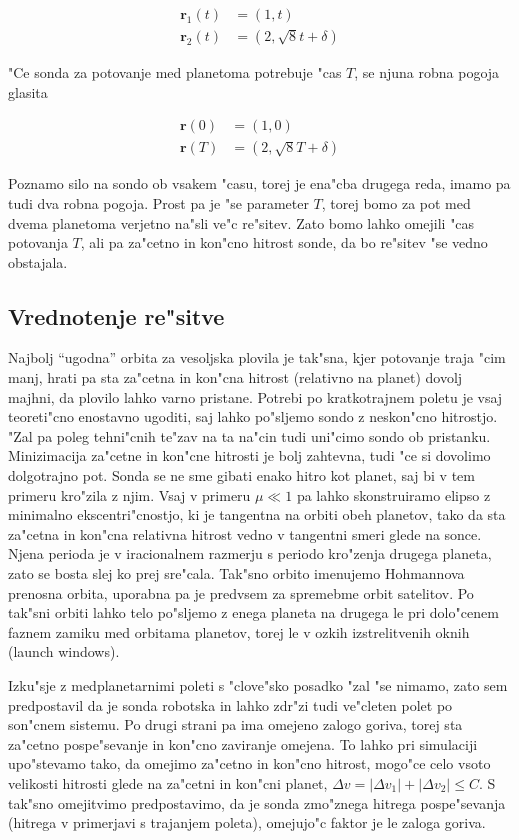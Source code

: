 \documentclass[a4paper,10pt]{article}
\renewcommand{\vec}{\mathbf}
\begin{document}
\begin{align}
 \vec r_1(t) &= (1, t) \\
 \vec r_2(t) &= (2, \sqrt{8}t + \delta)
\end{align}

"Ce sonda za potovanje med planetoma potrebuje "cas $T$, se njuna robna pogoja glasita

\begin{align}
 \vec r(0) &= (1, 0) \\
 \vec r(T) &= (2, \sqrt{8} T + \delta)
\end{align}

Poznamo silo na sondo ob vsakem "casu, torej je ena"cba drugega reda, imamo pa tudi dva robna pogoja. Prost pa je "se parameter $T$, torej bomo za pot med dvema planetoma verjetno na"sli ve"c re"sitev. Zato bomo lahko omejili "cas potovanja $T$, ali pa za"cetno in kon"cno hitrost sonde, da bo re"sitev "se vedno obstajala. 

\subsection{Vrednotenje re"sitve}

Najbolj ``ugodna'' orbita za vesoljska plovila je tak"sna, kjer potovanje traja "cim manj, hrati pa sta za"cetna in kon"cna hitrost (relativno na planet) dovolj majhni, da plovilo lahko varno pristane. Potrebi po kratkotrajnem poletu je vsaj teoreti"cno enostavno ugoditi, saj lahko po"sljemo sondo z neskon"cno hitrostjo. "Zal pa poleg tehni"cnih te"zav na ta na"cin tudi uni"cimo sondo ob pristanku. 
Minizimacija za"cetne in kon"cne hitrosti je bolj zahtevna, tudi "ce si dovolimo dolgotrajno pot. Sonda se ne sme gibati enako hitro kot planet, saj bi v tem primeru kro"zila z njim. Vsaj v primeru $\mu \ll 1$ pa lahko skonstruiramo elipso z minimalno ekscentri"cnostjo, ki je tangentna na orbiti obeh planetov, tako da sta za"cetna in kon"cna relativna hitrost vedno v tangentni smeri glede na sonce. 
Njena perioda je v iracionalnem razmerju s periodo kro"zenja drugega planeta, zato se bosta slej ko prej sre"cala. Tak"sno orbito imenujemo Hohmannova prenosna orbita, uporabna pa je predvsem za spremebme orbit satelitov. Po tak"sni orbiti lahko telo po"sljemo z enega planeta na drugega le pri dolo"cenem faznem zamiku med orbitama planetov, torej le v ozkih izstrelitvenih oknih (launch windows). 

Izku"sje z medplanetarnimi poleti s "clove"sko posadko "zal "se nimamo, zato sem predpostavil da je sonda robotska in lahko zdr"zi tudi ve"cleten polet po son"cnem sistemu. Po drugi strani pa ima omejeno zalogo goriva, torej sta za"cetno pospe"sevanje in kon"cno zaviranje omejena. To lahko pri simulaciji upo"stevamo tako, da omejimo za"cetno in kon"cno hitrost, mogo"ce celo 
vsoto velikosti hitrosti glede na za"cetni in kon"cni planet, $\Delta v = |\Delta v_1| + |\Delta v_2| \leq C$. S tak"sno omejitvimo predpostavimo, da je sonda zmo"znega hitrega pospe"sevanja (hitrega v primerjavi s trajanjem poleta), omejujo"c faktor je le zaloga goriva. 
\end{document}
